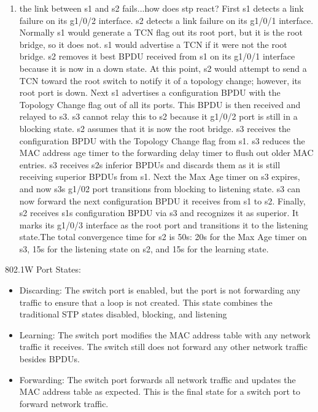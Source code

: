 \documentclass{article}
\begin{document}
\begin{enumerate}[label = \arabic*.]
\item the link between s1 and s2 fails...how does stp react? First s1 detects a link failure on its g1/0/2 interface. s2 detects a link failure on its g1/0/1 interface. Normally s1 would generate a TCN flag out its root port, but it is the root bridge, so it does not. s1 would advertise a TCN if it were not the root bridge. s2 removes it best BPDU received from s1 on its g1/0/1 interface because it is now in a down state. At this point, s2 would attempt to send a TCN toward the root switch to notify it of a topology change; however, its root port is down. Next s1 advertises a configuration BPDU with the Topology Change flag out of all its ports. This BPDU is then received and relayed to s3. s3 cannot relay this to s2 because it g1/0/2 port is still in a blocking state. s2 assumes that it is now the root bridge. s3 receives the configuration BPDU with the Topology Change flag from s1. s3 reduces the MAC address age timer to the forwarding delay timer to flush out older MAC entries. s3 receives s2s inferior BPDUs and discards them as it is still receiving superior BPDUs from s1. Next the Max Age timer on s3 expires, and now s3s g1/02 port transitions from blocking to listening state. s3 can now forward the next configuration BPDU it receives from s1 to s2. Finally, s2 receives s1s configuration BPDU via s3 and recognizes it as superior. It marks its g1/0/3 interface as the root port and transitions it to the listening state.The total convergence time for s2 is 50s: 20s for the Max Age timer on s3, 15s for the listening state on s2, and 15s for the learning state.
\end{enumerate}

802.1W Port States:
\begin{itemize}
\item Discarding: The switch port is enabled, but the port is not forwarding any traffic to ensure that a loop is not created. This state combines the traditional STP states disabled, blocking, and listening
\item Learning: The switch port modifies the MAC address table with any network traffic it receives. The switch still does not forward any other network traffic besides BPDUs.
\item Forwarding: The switch port forwards all network traffic and updates the MAC address table as expected. This is the final state for a switch port to forward network traffic.
\end{itemize}
\end{document}

